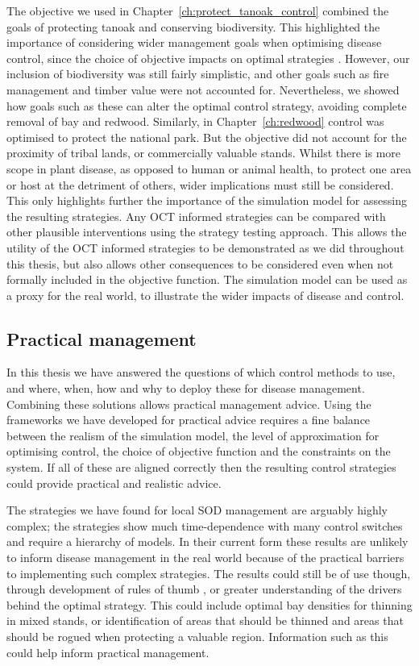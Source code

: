 The objective we used in Chapter~\ref{ch:protect_tanoak_control} combined the goals of protecting tanoak and conserving biodiversity. This highlighted the importance of considering wider management goals when optimising disease control, since the choice of objective impacts on optimal strategies \citep{probert_decision_2016}. However, our inclusion of biodiversity was still fairly simplistic, and other goals such as fire management and timber value were not accounted for. Nevertheless, we showed how goals such as these can alter the optimal control strategy, avoiding complete removal of bay and redwood. Similarly, in Chapter~\ref{ch:redwood} control was optimised to protect the national park. But the objective did not account for the proximity of tribal lands, or commercially valuable stands. Whilst there is more scope in plant disease, as opposed to human or animal health, to protect one area or host at the detriment of others, wider implications must still be considered. This only highlights further the importance of the simulation model for assessing the resulting strategies. Any OCT informed strategies can be compared with other plausible interventions using the strategy testing approach. This allows the utility of the OCT informed strategies to be demonstrated as we did throughout this thesis, but also allows other consequences to be considered even when not formally included in the objective function. The simulation model can be used as a proxy for the real world, to illustrate the wider impacts of disease and control.

\subsection{Practical management}

In this thesis we have answered the questions of which control methods to use, and where, when, how and why to deploy these for disease management. Combining these solutions allows practical management advice. Using the frameworks we have developed for practical advice requires a fine balance between the realism of the simulation model, the level of approximation for optimising control, the choice of objective function and the constraints on the system. If all of these are aligned correctly then the resulting control strategies could provide practical and realistic advice.

The strategies we have found for local SOD management are arguably highly complex; the strategies show much time-dependence with many control switches and require a hierarchy of models. In their current form these results are unlikely to inform disease management in the real world because of the practical barriers to implementing such complex strategies. The results could still be of use though, through development of rules of thumb \citep[e.g.][]{parnell_early_2015,hyatt-twynam_risk-based_2017}, or greater understanding of the drivers behind the optimal strategy. This could include optimal bay densities for thinning in mixed stands, or identification of areas that should be thinned and areas that should be rogued when protecting a valuable region. Information such as this could help inform practical management.


